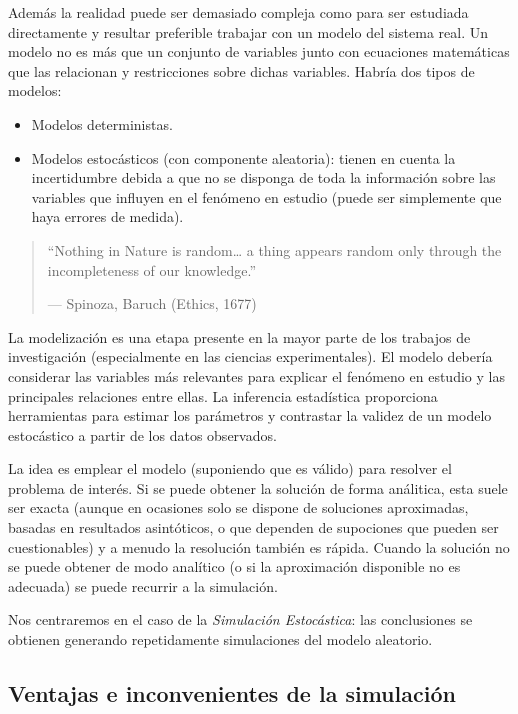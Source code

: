 \documentclass[
]{book}
\theoremstyle{break}
\theoremstyle{definition}
\theoremstyle{definition}
\theoremstyle{definition}
\theoremstyle{remark}
\begin{document}
Además la realidad puede ser demasiado compleja como para ser estudiada directamente y resultar preferible trabajar con un modelo del sistema real.
Un modelo no es más que un conjunto de variables junto con ecuaciones matemáticas que las relacionan y restricciones sobre dichas variables.
Habría dos tipos de modelos:

\begin{itemize}
\item
  Modelos deterministas.
\item
  Modelos estocásticos (con componente aleatoria): tienen en cuenta la incertidumbre debida a que no se disponga de toda la información sobre las variables que influyen en el fenómeno en estudio (puede ser simplemente que haya errores de medida).
\end{itemize}

\begin{quote}
``Nothing in Nature is random\ldots{} a thing appears random only through the incompleteness of our knowledge.''

--- Spinoza, Baruch (Ethics, 1677)
\end{quote}

La modelización es una etapa presente en la mayor parte de los trabajos de investigación (especialmente en las ciencias experimentales).
El modelo debería considerar las variables más relevantes para explicar el fenómeno en estudio y las principales relaciones entre ellas.
La inferencia estadística proporciona herramientas para estimar los parámetros y contrastar la validez de un modelo estocástico a partir de los datos observados.

La idea es emplear el modelo (suponiendo que es válido) para resolver el problema de interés.
Si se puede obtener la solución de forma análitica, esta suele ser exacta (aunque en ocasiones solo se dispone de soluciones aproximadas, basadas en resultados asintóticos, o que dependen de supociones que pueden ser cuestionables) y a menudo la resolución también es rápida.
Cuando la solución no se puede obtener de modo analítico (o si la aproximación disponible no es adecuada) se puede recurrir a la simulación.

Nos centraremos en el caso de la \emph{Simulación Estocástica}: las conclusiones se obtienen generando repetidamente simulaciones del modelo aleatorio.

\hypertarget{ventajas-e-inconvenientes-de-la-simulaciuxf3n}{%
\subsection{Ventajas e inconvenientes de la simulación}\label{ventajas-e-inconvenientes-de-la-simulaciuxf3n}}
\end{document}
